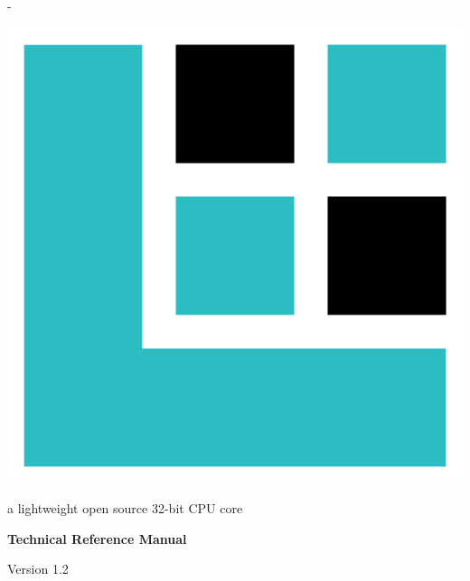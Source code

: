 \frontmatter


\thispagestyle{empty}
\calccentering{\unitlength}
\begin{adjustwidth*}{\unitlength}{-\unitlength}
	\vspace*{\fill}
	\begin{center}
	\DoubleSpacing
	\includegraphics[scale=0.2]{images/lxp32-logo.pdf}\par
	\vspace{\onelineskip}
	\huge \lxp{}\par
	\Large a lightweight open source 32-bit CPU core\par
	\LARGE \textbf{Technical Reference Manual}\par
	\vspace{1.2\onelineskip}
	\large Version 1.2\par
	\vspace*{4\onelineskip}
	\end{center}
	\vspace*{\fill}
\end{adjustwidth*}

\clearpage


\thispagestyle{empty}

